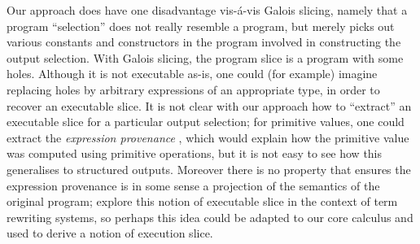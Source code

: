 Our approach does have one disadvantage vis-\'a-vis Galois slicing, namely that a program ``selection'' does not really resemble a program, but merely picks out various constants and constructors in the program involved in constructing the output selection. With Galois slicing, the program slice is a program with some holes. Although it is not executable as-is, one could (for example) imagine replacing holes by arbitrary expressions of an appropriate type, in order to recover an executable slice. It is not clear with our approach how to ``extract'' an executable slice for a particular output selection; for primitive values, one could extract the \emph{expression provenance} \cite{acar12}, which would explain how the primitive value was computed using primitive operations, but it is not easy to see how this generalises to structured outputs. Moreover there is no property that ensures the expression provenance is in some sense a projection of the semantics of the original program; \cite{field98} explore this notion of executable slice in the context of term rewriting systems, so perhaps this idea could be adapted to our core calculus and used to derive a notion of execution slice. 
